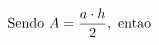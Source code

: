 \documentclass[preview]{standalone}
\begin{document}
\begin{align*}
\special{dvisvgm:raw <g id='unique000'>}\text{Sendo } A = \frac{a \cdot h}{2},\text{ entao }\special{dvisvgm:raw </g>}
\end{align*}
\end{document}
